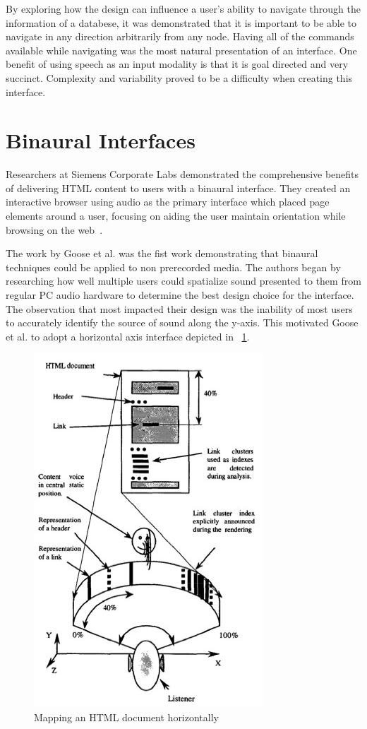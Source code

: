 By exploring how the design can influence a user's ability to navigate through
the information of a databese, it was demonstrated that it is important to
be able to navigate in any direction arbitrarily from any node. Having all of
the commands available while navigating was the most natural presentation of
an interface.  One benefit of using speech as an input modality is that it is
goal directed and very succinct.  Complexity and variability proved to be a
difficulty when creating this interface.


\section{                  Binaural Interfaces                               }

Researchers at Siemens Corporate Labs demonstrated the comprehensive benefits
of delivering HTML content to users with a binaural interface.  They created
an interactive browser using audio as the primary interface which placed page
elements around a user, focusing on aiding the user maintain orientation while
browsing on the web~\cite{goose19993dAudio}.

The work by Goose et al. was the fist work demonstrating that binaural techniques
could be applied to non prerecorded media. The authors began by researching
how well multiple users could spatialize sound presented to them from regular
PC audio hardware to determine the best design choice for the interface. The
observation that most impacted their design was the inability of most users
to accurately identify the source of sound along the y-axis.  This motivated
Goose et al. to adopt a horizontal axis interface depicted in ~\ref{fig:goose_horizon}.

\begin{figure}[t]
    \centering
    \includegraphics[width=.4\linewidth]{images/goose_horizon.jpg}
    \caption{Mapping an HTML document horizontally}
    \label{fig:goose_horizon}
\end{figure}


